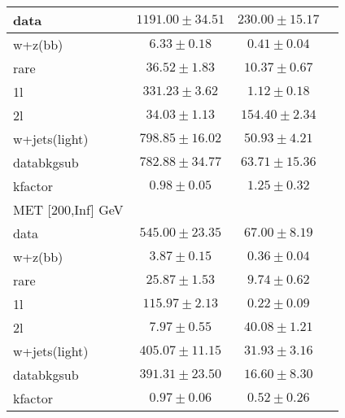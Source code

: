 \begin{table}
\begin{center}
\begin{tabular}{lccc}
\hline
data&$1191.00\pm34.51$&$230.00\pm15.17$\\
\hline
w+z(bb)&$6.33\pm0.18$&$0.41\pm0.04$\\
rare&$36.52\pm1.83$&$10.37\pm0.67$\\
1l&$331.23\pm3.62$&$1.12\pm0.18$\\
2l&$34.03\pm1.13$&$154.40\pm2.34$\\
w+jets(light)&$798.85\pm16.02$&$50.93\pm4.21$\\
\hline
databkgsub&$782.88\pm34.77$&$63.71\pm15.36$\\
kfactor&$0.98\pm0.05$&$1.25\pm0.32$\\
\hline\hline
\hline
MET [200,Inf] GeV & &\\
\hline
data&$545.00\pm23.35$&$67.00\pm8.19$\\
\hline
w+z(bb)&$3.87\pm0.15$&$0.36\pm0.04$\\
rare&$25.87\pm1.53$&$9.74\pm0.62$\\
1l&$115.97\pm2.13$&$0.22\pm0.09$\\
2l&$7.97\pm0.55$&$40.08\pm1.21$\\
w+jets(light)&$405.07\pm11.15$&$31.93\pm3.16$\\
\hline
databkgsub&$391.31\pm23.50$&$16.60\pm8.30$\\
kfactor&$0.97\pm0.06$&$0.52\pm0.26$\\
\hline\hline
\hline
\end{tabular}
\end{center}
\end{table}
